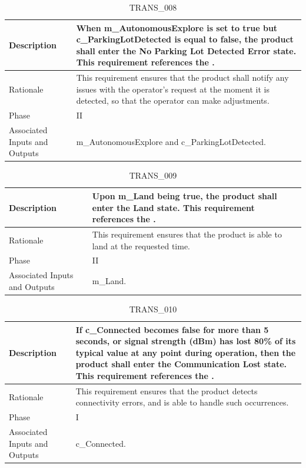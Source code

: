 \documentclass{article}
\begin{document}
\begin{table}[!h]
\begin{center}
\caption {TRANS\_008} 
\label{TRANS_008}
\begin{tabular}{ | m{3cm} | m{11cm} | }
\hline
Description & When m\_AutonomousExplore is set to true but c\_ParkingLotDetected is equal to false, the product shall enter the No Parking Lot Detected Error state. This requirement references the \nameref{No Parking Lot Detected Error State}. \\
\hline
Rationale & This requirement ensures that the product shall notify any issues with the operator's request at the moment it is detected, so that the operator can make adjustments. \\
\hline
Phase & II \\
\hline
Associated Inputs and Outputs & m\_AutonomousExplore and c\_ParkingLotDetected. \\
\hline
\end{tabular}
\end{center}
\end{table}

\begin{table}[!h]
\begin{center}
\caption {TRANS\_009} 
\label{TRANS_009}
\begin{tabular}{ | m{3cm} | m{11cm} | }
\hline
Description & Upon m\_Land being true, the product shall enter the Land state. This requirement references the \nameref{Land State}. \\
\hline
Rationale & This requirement ensures that the product is able to land at the requested time. \\
\hline
Phase & II \\
\hline
Associated Inputs and Outputs & m\_Land. \\
\hline
\end{tabular}
\end{center}
\end{table}

\begin{table}[!h]
\begin{center}
\caption {TRANS\_010} 
\label{TRANS_010}
\begin{tabular}{ | m{3cm} | m{11cm} | }
\hline
Description & If c\_Connected becomes false for more than 5 seconds, or signal strength (dBm) has lost 80\% of its typical value at any point during operation, then the product shall enter the Communication Lost state. This requirement references the \nameref{Communication Lost State}. \\
\hline
Rationale & This requirement ensures that the product detects connectivity errors, and is able to handle such occurrences. \\
\hline
Phase & I \\
\hline
Associated Inputs and Outputs & c\_Connected. \\
\hline
\end{tabular}
\end{center}
\end{table}
\end{document}
